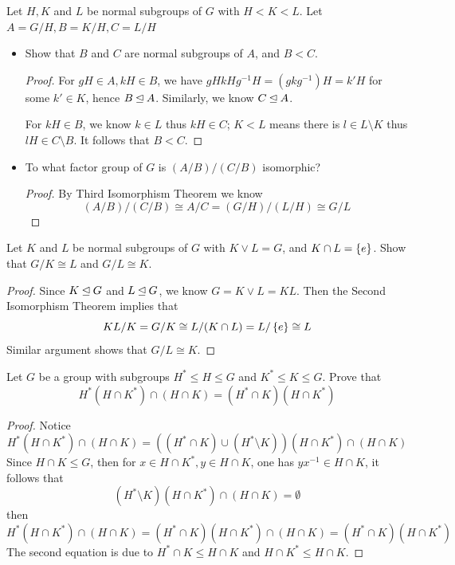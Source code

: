 \documentclass[12pt,a4paper]{article}
\begin{document}
    \begin{ex}
        Let $H,K$ and $L$ be normal subgroups of $G$ with $H<K<L$. Let $A=G/H,B=K/H,C=L/H$
        \begin{itemize}
            \item Show that $B$ and $C$ are normal subgroups of $A$, and $B<C$.
            \begin{proof}
                For $gH\in A,kH\in B$, we have $gHkHg^{-1}H=(gkg^{-1})H=k'H$ for some $k'\in K$, hence $B\unlhd A$. Similarly, we know $C\unlhd A$.
                
                For $kH\in B$, we know $k\in L$ thus $kH\in C$; $K<L$ means there is $l\in L\setminus K$ thus $lH\in C\setminus B$. It follows that $B<C$.
            \end{proof}
            \item To what factor group of $G$ is $(A/B)/(C/B)$ isomorphic?
            \begin{proof}
                By Third Isomorphism Theorem we know
                \[
                    (A/B)/(C/B)\cong A/C=(G/H)/(L/H)\cong G/L  
                \]
            \end{proof}
        \end{itemize}
    \end{ex}
    \bigskip

    \begin{ex}
        Let $K$ and $L$ be normal subgroups of $G$ with $K\vee L=G$, and $K\cap L=\left\{ e \right\}$. Show that $G/K\cong L$ and $G/L\cong K$.
    \end{ex}
    \begin{proof}
        Since $K\unlhd G$ and $L\unlhd G$, we know $G=K\vee L=KL$. Then the Second Isomorphism Theorem implies that
        \[
            KL/K=G/K\cong L/(K\cap L)=L/\left\{ e \right\}\cong L
        \]
        Similar argument shows that $G/L\cong K$.
    \end{proof}
    \bigskip

    \begin{ex}
        Let $G$ be a group with subgroups $H^*\leq H\leq G$ and $K^*\leq K\leq G$. Prove that
        \[
            H^*(H\cap K^*)\cap(H\cap K)=(H^*\cap K)(H\cap K^*)
        \]
    \end{ex}
    \begin{proof}
        Notice
        \[
            H^*(H\cap K^*)\cap(H\cap K)=((H^*\cap K)\cup(H^*\setminus K))(H\cap K^*)\cap(H\cap K)
        \]
        Since $H\cap K\leq G$, then for $x\in H\cap K^*,y\in H\cap K$, one has $yx^{-1}\in H\cap K$, it follows that
        \[
            (H^*\setminus K)(H\cap K^*)\cap(H\cap K)=\emptyset
        \]
        then
        \[
            H^*(H\cap K^*)\cap(H\cap K)=(H^*\cap K)(H\cap K^*)\cap(H\cap K)=(H^*\cap K)(H\cap K^*)
        \]
        The second equation is due to $H^*\cap K\leq H\cap K$ and $H\cap K^*\leq H\cap K$.
    \end{proof}
    
\end{document}
